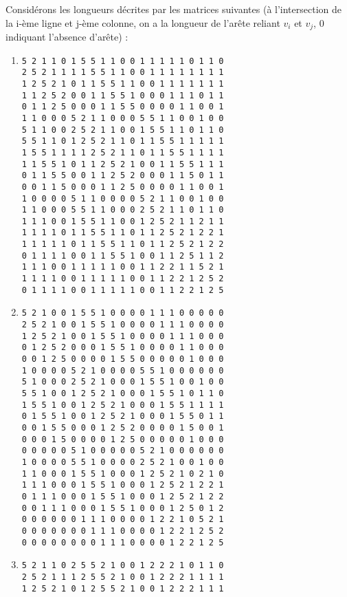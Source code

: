 \documentclass[a4paper,francais]{article}
\theoremstyle{definition}
\begin{document}
Considérons les longueurs décrites par les matrices suivantes
(à l'intersection de la i-ème ligne et j-ème colonne, on a la
longueur de l'arête reliant $v_i$ et $v_j$, 0 indiquant l'absence
d'arête) :
\begin{enumerate}[label=(M\arabic*)]
\item
\begin{verbatim}
5 2 1 1 0 1 5 5 1 1 0 0 1 1 1 1 1 0 1 1 0 
2 5 2 1 1 1 1 5 5 1 1 0 0 1 1 1 1 1 1 1 1 
1 2 5 2 1 0 1 1 5 5 1 1 0 0 1 1 1 1 1 1 1 
1 1 2 5 2 0 0 1 1 5 5 1 0 0 0 1 1 1 0 1 1 
0 1 1 2 5 0 0 0 1 1 5 5 0 0 0 0 1 1 0 0 1 
1 1 0 0 0 5 2 1 1 0 0 0 5 5 1 1 0 0 1 0 0 
5 1 1 0 0 2 5 2 1 1 0 0 1 5 5 1 1 0 1 1 0 
5 5 1 1 0 1 2 5 2 1 1 0 1 1 5 5 1 1 1 1 1 
1 5 5 1 1 1 1 2 5 2 1 1 0 1 1 5 5 1 1 1 1 
1 1 5 5 1 0 1 1 2 5 2 1 0 0 1 1 5 5 1 1 1 
0 1 1 5 5 0 0 1 1 2 5 2 0 0 0 1 1 5 0 1 1 
0 0 1 1 5 0 0 0 1 1 2 5 0 0 0 0 1 1 0 0 1 
1 0 0 0 0 5 1 1 0 0 0 0 5 2 1 1 0 0 1 0 0 
1 1 0 0 0 5 5 1 1 0 0 0 2 5 2 1 1 0 1 1 0 
1 1 1 0 0 1 5 5 1 1 0 0 1 2 5 2 1 1 2 1 1 
1 1 1 1 0 1 1 5 5 1 1 0 1 1 2 5 2 1 2 2 1 
1 1 1 1 1 0 1 1 5 5 1 1 0 1 1 2 5 2 1 2 2 
0 1 1 1 1 0 0 1 1 5 5 1 0 0 1 1 2 5 1 1 2 
1 1 1 0 0 1 1 1 1 1 0 0 1 1 2 2 1 1 5 2 1 
1 1 1 1 0 0 1 1 1 1 1 0 0 1 1 2 2 1 2 5 2 
0 1 1 1 1 0 0 1 1 1 1 1 0 0 1 1 2 2 1 2 5
\end{verbatim}
\item
\begin{verbatim}
5 2 1 0 0 1 5 5 1 0 0 0 0 1 1 1 0 0 0 0 0 
2 5 2 1 0 0 1 5 5 1 0 0 0 0 1 1 1 0 0 0 0 
1 2 5 2 1 0 0 1 5 5 1 0 0 0 0 1 1 1 0 0 0 
0 1 2 5 2 0 0 0 1 5 5 1 0 0 0 0 1 1 0 0 0 
0 0 1 2 5 0 0 0 0 1 5 5 0 0 0 0 0 1 0 0 0 
1 0 0 0 0 5 2 1 0 0 0 0 5 5 1 0 0 0 0 0 0 
5 1 0 0 0 2 5 2 1 0 0 0 1 5 5 1 0 0 1 0 0 
5 5 1 0 0 1 2 5 2 1 0 0 0 1 5 5 1 0 1 1 0 
1 5 5 1 0 0 1 2 5 2 1 0 0 0 1 5 5 1 1 1 1 
0 1 5 5 1 0 0 1 2 5 2 1 0 0 0 1 5 5 0 1 1 
0 0 1 5 5 0 0 0 1 2 5 2 0 0 0 0 1 5 0 0 1 
0 0 0 1 5 0 0 0 0 1 2 5 0 0 0 0 0 1 0 0 0 
0 0 0 0 0 5 1 0 0 0 0 0 5 2 1 0 0 0 0 0 0 
1 0 0 0 0 5 5 1 0 0 0 0 2 5 2 1 0 0 1 0 0 
1 1 0 0 0 1 5 5 1 0 0 0 1 2 5 2 1 0 2 1 0 
1 1 1 0 0 0 1 5 5 1 0 0 0 1 2 5 2 1 2 2 1 
0 1 1 1 0 0 0 1 5 5 1 0 0 0 1 2 5 2 1 2 2 
0 0 1 1 1 0 0 0 1 5 5 1 0 0 0 1 2 5 0 1 2 
0 0 0 0 0 0 1 1 1 0 0 0 0 1 2 2 1 0 5 2 1 
0 0 0 0 0 0 0 1 1 1 0 0 0 0 1 2 2 1 2 5 2 
0 0 0 0 0 0 0 0 1 1 1 0 0 0 0 1 2 2 1 2 5
\end{verbatim}
\item
\begin{verbatim}
5 2 1 1 0 2 5 5 2 1 0 0 1 2 2 2 1 0 1 1 0 
2 5 2 1 1 1 2 5 5 2 1 0 0 1 2 2 2 1 1 1 1 
1 2 5 2 1 0 1 2 5 5 2 1 0 0 1 2 2 2 1 1 1 

\end{verbatim}
\end{enumerate}
\end{document}
